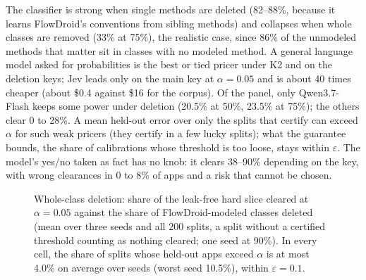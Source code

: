 The classifier is strong when single methods are deleted (82--88\%, because it learns FlowDroid's conventions from sibling methods) and collapses when whole classes are removed (33\% at 75\%), the realistic case, since 86\% of the unmodeled methods that matter sit in classes with no modeled method.
A general language model asked for probabilities is the best or tied pricer under K2 and on the deletion keys; Jev leads only on the main key at $\alpha=0.05$ and is about 40 times cheaper (about \$0.4 against \$16 for the corpus).
Of the panel, only Qwen3.7-Flash keeps some power under deletion (20.5\% at 50\%, 23.5\% at 75\%); the others clear 0 to 28\%. A mean held-out error over only the splits that certify can exceed $\alpha$ for such weak pricers (they certify in a few lucky splits); what the guarantee bounds, the share of calibrations whose threshold is too loose, stays within $\varepsilon$.
The model's yes/no taken as fact has no knob: it clears 38--90\% depending on the key, with wrong clearances in 0 to 8\% of apps and a risk that cannot be chosen.

\begin{figure}[t]

\caption{Whole-class deletion: share of the leak-free hard slice cleared at $\alpha=0.05$ against the share of FlowDroid-modeled classes deleted (mean over three seeds and all 200 splits, a split without a certified threshold counting as nothing cleared; one seed at 90\%). In every cell, the share of splits whose held-out apps exceed $\alpha$ is at most 4.0\% on average over seeds (worst seed 10.5\%), within $\varepsilon=0.1$.}
\label{fig:deletion}
\end{figure}

